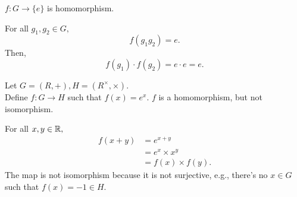 \begin{eg}
    $f:G \rightarrow \{e\}$ is homomorphism.
\end{eg}
\begin{explanation}
    For all $g_1, g_2 \in G,$
    \[f(g_1g_2) = e.\]
    Then,
    \[f(g_1) \cdot f(g_2) = e \cdot e = e.\]
\end{explanation}
\begin{eg}
    Let $G = (R, +), H = (R^\times, \times).$\\
    Define $f:G \rightarrow H$ such that $f(x) = e^x$. $f$ is a homomorphism, but not isomorphism.
\end{eg}
\begin{explanation}
    For all $x,y \in \mathbb{R},$
    \begin{align*}
        f(x + y) &= e^{x+y}\\
        &= e^x \times x^y\\
        &= f(x) \times f(y).
    \end{align*}
    The map is not isomorphism because it is not surjective, e.g., there's no $x\in G$ such that $f(x) = -1 \in H$.
\end{explanation}